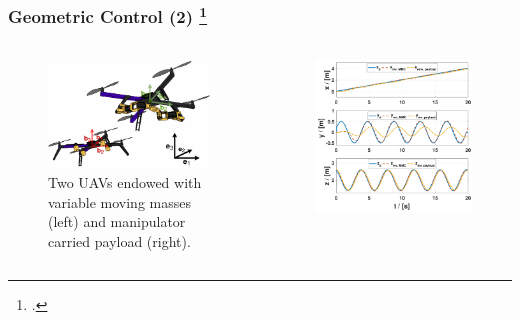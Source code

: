 \begin{frame}
	\frametitle{Geometric Control (2) \footcite{Markovic2019}}
	
	\begin{columns}
		\begin{column}{0.5\textwidth}\centering
			\begin{figure}[H]
				\includegraphics[width=0.8\columnwidth]{figures/uav.png}	
				\centering
				\caption{Two UAVs endowed with variable moving masses (left) and manipulator carried payload (right). }
				\label{fig:uav_model}
			\end{figure}
		\end{column}
		
		\begin{column}{0.5\textwidth}\centering
			\begin{figure}
				\centering
				\includegraphics[width=0.95\columnwidth]{figures/both_pos_crop.pdf}
				\label{fig:traj_pos}
			\end{figure}
		\end{column}
	\end{columns}
\end{frame}